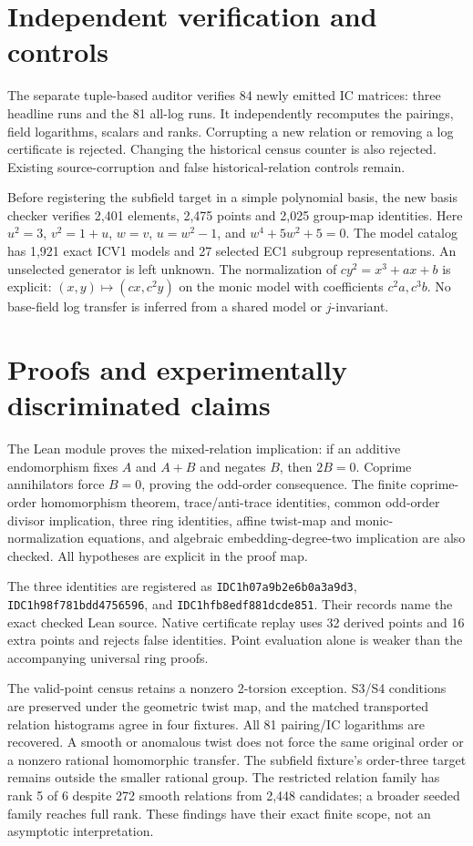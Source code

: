 \documentclass[10pt]{article}
\begin{document}
\newpage
\section*{Independent verification and controls}
The separate tuple-based auditor verifies 84 newly emitted IC matrices: three
headline runs and the 81 all-log runs. It independently recomputes the pairings,
field logarithms, scalars and ranks. Corrupting a new relation or removing a
log certificate is rejected. Changing the historical census counter is also
rejected. Existing source-corruption and false historical-relation controls remain.

Before registering the subfield target in a simple polynomial basis, the new
basis checker verifies 2,401 elements, 2,475 points and 2,025 group-map identities.
Here $u^2=3$, $v^2=1+u$, $w=v$, $u=w^2-1$, and
$w^4+5w^2+5=0$. The model catalog has 1,921 exact ICV1 models and 27 selected
EC1 subgroup representations. An unselected generator is left unknown.
The normalization of $c y^2=x^3+ax+b$ is explicit:
$(x,y)\mapsto(cx,c^2y)$ on the monic model with coefficients $c^2a,c^3b$.
No base-field log transfer is inferred from a shared model or $j$-invariant.

\section*{Proofs and experimentally discriminated claims}
The Lean module proves the mixed-relation implication: if an additive
endomorphism fixes $A$ and $A+B$ and negates $B$, then $2B=0$.
Coprime annihilators force $B=0$, proving the odd-order consequence.
The finite coprime-order homomorphism theorem, trace/anti-trace identities,
common odd-order divisor implication, three ring identities, affine twist-map
and monic-normalization equations, and algebraic embedding-degree-two
implication are also checked. All hypotheses are explicit in the proof map.

The three identities are registered as \texttt{IDC1h07a9b2e6b0a3a9d3},
\texttt{IDC1h98f781bdd4756596}, and \texttt{IDC1hfb8edf881dcde851}.
Their records name the exact checked Lean source. Native certificate replay uses
32 derived points and 16 extra points and rejects false identities. Point
evaluation alone is weaker than the accompanying universal ring proofs.

The valid-point census retains a nonzero 2-torsion exception. S3/S4 conditions
are preserved under the geometric twist map, and the matched transported
relation histograms agree in four fixtures. All 81 pairing/IC logarithms are
recovered. A smooth or anomalous twist does not force the same original order
or a nonzero rational homomorphic transfer. The subfield fixture's order-three
target remains outside the smaller rational group. The restricted relation
family has rank 5 of 6 despite 272 smooth relations from 2,448 candidates;
a broader seeded family reaches full rank. These findings have their exact
finite scope, not an asymptotic interpretation.
\end{document}
